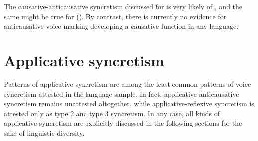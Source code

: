 The causative-anticausative syncretism discussed for  is very likely of , and the same might be true for  (). By contrast, there is currently no evidence for anticausative voice marking developing a causative function in any language.

\section{Applicative syncretism} \label{sec:simple-syncretism:applicative}
Patterns of applicative syncretism are among the least common patterns of voice syncretism attested in the language sample. In fact, applicative-anticausative syncretism remains unattested altogether, while applicative-reflexive syncretism is attested only as type 2 and type 3 syncretism. In any case, all kinds of applicative syncretism are explicitly discussed in the following sections for the sake of linguistic diversity.

